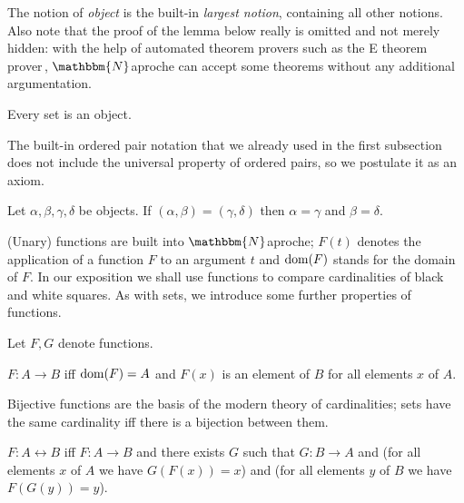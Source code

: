 \documentclass{article}
\newcommand{\Naproche}{$\mathbbm{N}$aproche}
\begin{document}
The notion of \textit{object}
is the built-in \textit{largest notion}, containing all other notions.
%
Also note that the proof of the lemma below really is omitted and not merely hidden:
with the help of automated theorem provers
such as the \textsf{E} theorem prover\,\cite{eprover}, \Naproche{}
can accept some theorems without any additional argumentation.


\begin{forthel}
    \begin{lemma}
        Every set is an object.
    \end{lemma}
\end{forthel}

The built-in ordered pair {notation} that we already used in the first
subsection does not include the universal property of ordered pairs,
so we postulate it as an axiom.

\begin{forthel}
    \begin{axiom}
        Let $\alpha, \beta, \gamma, \delta$ be objects.
        If $(\alpha, \beta) = (\gamma, \delta)$
        then $\alpha = \gamma$ and $\beta = \delta$.
    \end{axiom}
\end{forthel}

(Unary) functions are built into \Naproche{}; $F(t)$ denotes the
application of a function $F$ to an argument $t$ and
$\operatorname{dom}(F)$ stands for the domain of $F$. In our exposition we shall
use functions to compare cardinalities of black and white squares. As with
sets, we introduce some further properties of functions.

\begin{forthel}
    Let $F,G$ denote functions.

    \begin{definition}
        $F : A \to B$ iff $\operatorname{dom}(F) = A$ and
        $F(x)$ is an element of $B$ for all elements $x$ of $A$.
    \end{definition}
\end{forthel}

Bijective functions are the basis of the modern theory of cardinalities; sets
have the same cardinality iff there is a bijection between them.

\begin{forthel}
    \begin{definition}
        $F : A \leftrightarrow B$ iff $F : A \to B$ and there exists $G$ such that
        $G : B \to A$ and
        (for all elements $x$ of $A$ we have $G(F(x)) = x$) and
        (for all elements $y$ of $B$ we have $F(G(y)) = y$).
    \end{definition}
\end{forthel}
\end{document}
